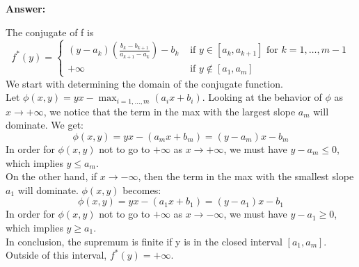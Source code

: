 \documentclass[11pt,a4paper]{article}
\newenvironment{solution}{
  \par\noindent\textbf{Answer:}\vspace{0.3em}
}{\vspace{1em}}
\begin{document}
\begin{enumerate}
    \begin{solution}
        The conjugate of f is
        \[
            f^* (y) = \begin{cases}
                (y - a_k) \left( \frac{b_k - b_{k+1}}{a_{k+1} - a_k} \right) - b_k &\text{ if } y \in [a_k, a_{k+1}] \text{ for } k=1, \dots, m-1\\
                +\infty &\text{ if } y \notin [a_1, a_m] 
            \end{cases}
        \]
        We start with determining the domain of the conjugate function.\\
        Let $\phi(x, y) = y x - \max_{i=1,\dots,m} (a_i x + b_i)$. Looking at the behavior of $\phi$ as $x \to +\infty$, we notice that the term in the max with the largest slope $a_m$ will dominate. We get:
        \[
            \phi(x, y) = yx - (a_m x + b_m) = (y - a_m) x - b_m
        \]
        In order for $\phi(x, y)$ not to go to $+\infty$ as $x \to +\infty$, we must have $y - a_m \leq 0$, which implies $y \leq a_m$.\\
        On the other hand, if $x \to -\infty$, then the term in the max with the smallest slope $a_1$ will dominate. $\phi(x, y)$ becomes:
        \[
            \phi(x, y) = yx - (a_1 x + b_1) = (y - a_1) x - b_1
        \]
        In order for $\phi(x, y)$ not to go to $+\infty$ as $x \to -\infty$, we must have $y - a_1 \geq 0$, which implies $y \geq a_1$.\\

        In conclusion, the supremum is finite if y is in the closed interval $[a_1, a_m]$. Outside of this interval, $f^*(y) = +\infty$.


\end{solution}
\end{enumerate}
\end{document}
